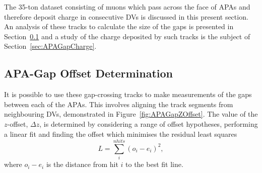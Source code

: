 The 35-ton dataset consisting of muons which pass across the face of APAs and therefore deposit charge in consecutive DVs is discussed in this present section.  An analysis of these tracks to calculate the size of the gaps is presented in Section~\ref{sec:APAGapOffsets} and a study of the charge deposited by such tracks is the subject of Section~\ref{sec:APAGapCharge}.

\subsection{APA-Gap Offset Determination}\label{sec:APAGapOffsets}

It is possible to use these gap-crossing tracks to make measurements of the gaps between each of the APAs.  This involves aligning the track segments from neighbouring DVs, demonstrated in Figure~\ref{fig:APAGapZOffset}.  The value of the $z$-offset, $\Delta z$, is determined by considering a range of offset hypotheses, performing a linear fit and finding the offset which minimises the residual least squares
\begin{equation}
  L = \sum_i^{nhits} (o_i - e_i)^2,
\end{equation}
where $o_i-e_i$ is the distance from hit $i$ to the best fit line.

